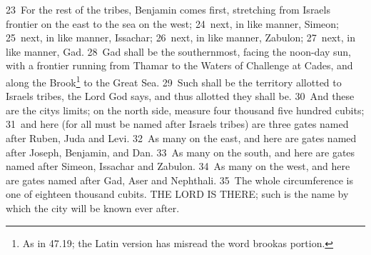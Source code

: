 \documentclass[10pt]{book} %
\begin{document}
\textcolor{benred8}{23}~For the rest of the tribes, Benjamin comes first, stretching from Israel\textquotesingle s frontier on the east to the sea on the west; \textcolor{benred8}{24}~next, in like manner, Simeon; \textcolor{benred8}{25}~next, in like manner, Issachar; \textcolor{benred8}{26}~next, in like manner, Zabulon; \textcolor{benred8}{27}~next, in like manner, Gad. \textcolor{benred8}{28}~Gad shall be the southernmost, facing the noon-day sun, with a frontier running from Thamar to the Waters of Challenge at Cades, and along the Brook\footnote[3]{As in 47.19; the Latin version has misread the word \textasciigrave brook\textquotesingle  as \textasciigrave portion\textquotesingle .} to the Great Sea. \textcolor{benred8}{29}~Such shall be the territory allotted to Israel\textquotesingle s tribes, the Lord God says, and thus allotted they shall be.
\textcolor{benred8}{30}~And these are the city\textquotesingle s limits; on the north side, measure four thousand five hundred cubits; \textcolor{benred8}{31}~and here (for all must be named after Israel\textquotesingle s tribes) are three gates named after Ruben, Juda and Levi. \textcolor{benred8}{32}~As many on the east, and here are gates named after Joseph, Benjamin, and Dan. \textcolor{benred8}{33}~As many on the south, and here are gates named after Simeon, Issachar and Zabulon. \textcolor{benred8}{34}~As many on the west, and here are gates named after Gad, Aser and Nephthali. \textcolor{benred8}{35}~The whole circumference is one of eighteen thousand cubits. THE LORD IS THERE; such is the name by which the city will be known ever after.
\end{document}

